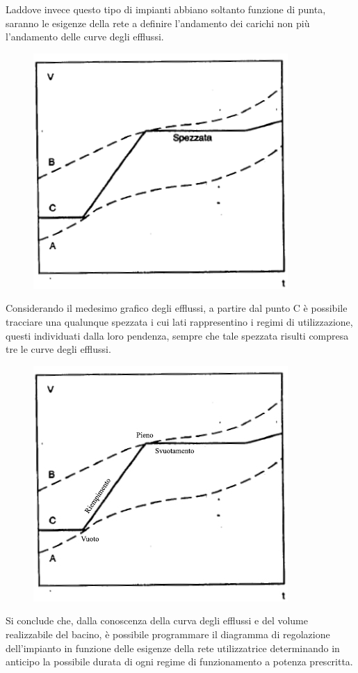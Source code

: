 \documentclass[a4paper, 15pt]{article}
\begin{document}
\begin{adjustwidth}{2in}{}
	Laddove invece questo tipo di impianti abbiano soltanto funzione di punta, saranno le esigenze della rete a definire l'andamento dei carichi non più l'andamento delle curve degli efflussi. 
\begin{figure}[H]
	\centering
	\includegraphics[width=0.4\linewidth]{immagini/caputo8}
	\label{fig:caputo8}
\end{figure}
	Considerando il medesimo grafico degli efflussi, a partire dal punto C è possibile tracciare una qualunque spezzata i cui lati rappresentino i regimi di utilizzazione, questi individuati dalla loro pendenza, sempre che tale spezzata risulti compresa tre le curve degli efflussi. 	
\begin{figure}[H]
	\centering
	\includegraphics[width=0.4\linewidth]{immagini/caputo8.1}
	\label{fig:caputo8.1}
\end{figure}	
	Si conclude che, dalla conoscenza della curva degli efflussi e del volume realizzabile del bacino, è possibile programmare il diagramma di regolazione dell'impianto in funzione delle esigenze della rete utilizzatrice determinando in anticipo la possibile durata di ogni regime di funzionamento a potenza prescritta. 	
\end{adjustwidth}		
\end{document}
